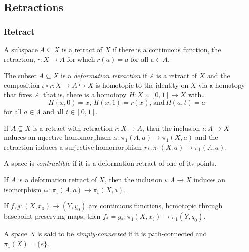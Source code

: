 \subsection{Retractions}

\subsubsection{Retract}\label{retract}
A subspace $A \subseteq X$ is a retract of $X$ if there is a continuous function, the retraction,
$r : X \rightarrow A$ for which $r(a) = a$ for all $a \in A$.

\label{deformationretract}
The subset $A \subseteq X$ is a \emph{deformation retraction} if $A$ is a retract of $X$ and the composition
$\iota \circ r : X \rightarrow A \hookrightarrow X$ is homotopic to the identity on $X$ via a homotopy that fixes $A$,
that is, there is a homotopy $H : X \times [0,1] \rightarrow X$ with\dots
$$H(x,0) = x, \, H(x,1) = r(x), \, \textrm{and} \, H(a,t) = a$$
for all $a \in A$ and all $t \in [0,1]$.

\begin{proposition}
If $A \subseteq X$ is a retract with retraction $r : X \rightarrow A$, then the inclusion $\iota : A \rightarrow X$ induces
an injective homomorphism $\iota_* : \pi_1(A,a) \rightarrow \pi_1(X,a)$ and the retraction induces a surjective homomorphism
$r_* : \pi_1(X,a) \rightarrow \pi_1(A,a)$.
\end{proposition}

\label{contractible}
A space is \emph{contractible} if it is a deformation retract of one of its points.

\begin{theorem}
\label{inclusioncontraction}
If $A$ is a deformation retract of $X$, then the inclusion $\iota : A \rightarrow X$ induces an isomorphism
$\iota_{*} : \pi_1(A, a) \rightarrow \pi_1(X, a)$.
\end{theorem}

\begin{lemma}
If $f,g:(X,x_0) \rightarrow (Y,y_0)$ are continuous functions, homotopic through basepoint preserving maps, then $f_* = g_* : \pi_1(X,x_0) \rightarrow \pi_1(Y,y_0)$.
\end{lemma}

\label{simplyconnected}
A space $X$ is said to be \emph{simply-connected} if it is path-connected and $\pi_1(X) = \{ e \}$.

